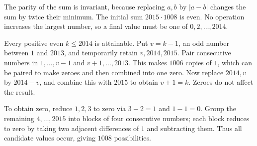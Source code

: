 The parity of the sum is invariant, because replacing $a,b$ by $|a-b|$ changes the sum by twice their minimum. The initial sum $2015\cdot1008$ is even. No operation increases the largest number, so a final value must be one of $0,2,\ldots,2014$.

Every positive even $k\le2014$ is attainable. Put $v=k-1$, an odd number between $1$ and $2013$, and temporarily retain $v,2014,2015$. Pair consecutive numbers in $1,\ldots,v-1$ and $v+1,\ldots,2013$. This makes $1006$ copies of $1$, which can be paired to make zeroes and then combined into one zero. Now replace $2014,v$ by $2014-v$, and combine this with $2015$ to obtain $v+1=k$. Zeroes do not affect the result.

To obtain zero, reduce $1,2,3$ to zero via $3-2=1$ and $1-1=0$. Group the remaining $4,\ldots,2015$ into blocks of four consecutive numbers; each block reduces to zero by taking two adjacent differences of $1$ and subtracting them. Thus all candidate values occur, giving $\boxed{1008}$ possibilities.
